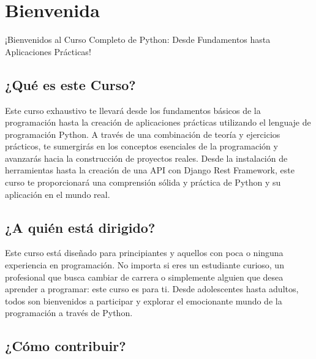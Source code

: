 \documentclass[
  a4paper,
  onepage,
  openany]{scrreprt}
\renewcommand*\contentsname{Tabla de contenidos}
\newcommand\contentsname{Tabla de contenidos}
\begin{document}
  \ifdefined\Shaded\renewenvironment{Shaded}{\begin{tcolorbox}[breakable, boxrule=0pt, borderline west={3pt}{0pt}{shadecolor}, interior hidden, sharp corners, enhanced, frame hidden]}{\end{tcolorbox}}\fi

\renewcommand*\contentsname{Tabla de contenidos}
{
\hypersetup{linkcolor=}
\setcounter{tocdepth}{2}
\tableofcontents
}

\hypertarget{bienvenida}{%
\chapter{Bienvenida}\label{bienvenida}}

¡Bienvenidos al Curso Completo de Python: Desde Fundamentos hasta
Aplicaciones Prácticas!

\hypertarget{quuxe9-es-este-curso}{%
\section{¿Qué es este Curso?}\label{quuxe9-es-este-curso}}

Este curso exhaustivo te llevará desde los fundamentos básicos de la
programación hasta la creación de aplicaciones prácticas utilizando el
lenguaje de programación Python. A través de una combinación de teoría y
ejercicios prácticos, te sumergirás en los conceptos esenciales de la
programación y avanzarás hacia la construcción de proyectos reales.
Desde la instalación de herramientas hasta la creación de una API con
Django Rest Framework, este curso te proporcionará una comprensión
sólida y práctica de Python y su aplicación en el mundo real.

\hypertarget{a-quiuxe9n-estuxe1-dirigido}{%
\section{¿A quién está dirigido?}\label{a-quiuxe9n-estuxe1-dirigido}}

Este curso está diseñado para principiantes y aquellos con poca o
ninguna experiencia en programación. No importa si eres un estudiante
curioso, un profesional que busca cambiar de carrera o simplemente
alguien que desea aprender a programar: este curso es para ti. Desde
adolescentes hasta adultos, todos son bienvenidos a participar y
explorar el emocionante mundo de la programación a través de Python.

\hypertarget{cuxf3mo-contribuir}{%
\section{¿Cómo contribuir?}\label{cuxf3mo-contribuir}}
\end{document}
